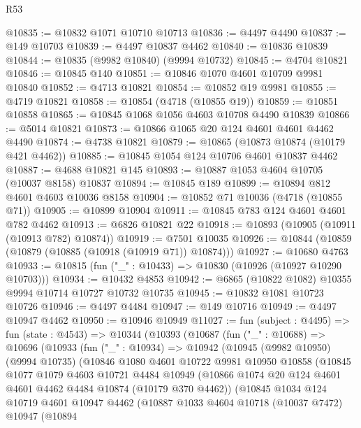 \begin{lexlean}{R53}
\begin{coremodule}
@10835 := @10832 @1071 @10710 @10713
@10836 := @4497 @4490
@10837 := @149 @10703
@10839 := @4497 @10837 @4462
@10840 := @10836 @10839
@10844 := @10835 (@9982 @10840) (@9994 @10732)
@10845 := @4704 @10821
@10846 := @10845 @140
@10851 := @10846 @1070 @4601 @10709 @9981 @10840
@10852 := @4713 @10821
@10854 := @10852 @19 @9981
@10855 := @4719 @10821
@10858 := @10854 (@4718 (@10855 @19))
@10859 := @10851 @10858
@10865 := @10845 @1068 @1056 @4603 @10708 @4490 @10839
@10866 := @5014 @10821
@10873 := @10866 @1065 @20 @124 @4601 @4601 @4462 @4490
@10874 := @4738 @10821
@10879 := @10865 (@10873 @10874 (@10179 @421 @4462))
@10885 := @10845 @1054 @124 @10706 @4601 @10837 @4462
@10887 := @4688 @10821 @145
@10893 := @10887 @1053 @4604 @10705 (@10037 @8158) @10837
@10894 := @10845 @189
@10899 := @10894 @812 @4601 @4603 @10036 @8158
@10904 := @10852 @71 @10036 (@4718 (@10855 @71))
@10905 := @10899 @10904
@10911 := @10845 @783 @124 @4601 @4601 @782 @4462
@10913 := @6826 @10821 @22
@10918 := @10893 (@10905 (@10911 (@10913 @782) @10874))
@10919 := @7501 @10035
@10926 := @10844 (@10859 (@10879 (@10885 (@10918 (@10919 @71)) @10874)))
@10927 := @10680 @4763
@10933 := @10815 (fun ("_" : @10433) => @10830 (@10926 (@10927 @10290 @10703)))
@10934 := @10432 @4853
@10942 := @6865 (@10822 @1082) @10355 @9994 @10714 @10727 @10732 @10735
@10945 := @10832 @1081 @10723 @10726
@10946 := @4497 @4484
@10947 := @149 @10716
@10949 := @4497 @10947 @4462
@10950 := @10946 @10949
@11027 := fun (subject : @4495) =>
  fun (state : @4543) =>
  @10344
    (@10393
      (@10687
        (fun ("_" : @10688) =>
        @10696
          (@10933
            (fun ("_" : @10934) =>
            @10942
              (@10945
                (@9982 @10950)
                (@9994 @10735)
                (@10846
                  @1080
                  @4601
                  @10722
                  @9981
                  @10950
                  @10858
                  (@10845
                    @1077
                    @1079
                    @4603
                    @10721
                    @4484
                    @10949
                    (@10866 @1074 @20 @124 @4601 @4601 @4462 @4484 @10874 (@10179 @370 @4462))
                    (@10845
                      @1034
                      @124
                      @10719
                      @4601
                      @10947
                      @4462
                      (@10887
                        @1033
                        @4604
                        @10718
                        (@10037 @7472)
                        @10947
                        (@10894

\end{coremodule}
\end{lexlean}
